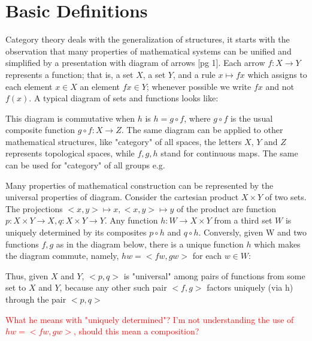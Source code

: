 \section*{Basic Definitions}

Category theory deals with the generalization of structures, it starts with the observation that many properties of mathematical systems can be unified and simplified by a presentation with diagram of arrows [pg 1]. Each arrow $f: X \to Y$ represents a function; that is, a set $X$, a set $Y$, and a rule $x \mapsto fx$ which assigns to each element $x \in X$ an element $fx \in Y$; whenever possible we write $fx$ and not $f(x)$. A typical diagram of sets and functions looks like: 
\begin{center}
\end{center}

This diagram is commutative when $h$ is $h = g \circ f$, where $g \circ f$ is the usual composite function $g \circ f: X \to Z$. The same diagram can be applied to other mathematical structures, like "category" of all spaces, the letters $X$, $Y$ and $Z$ represents topological spaces, while $f, g, h$ stand for continuous maps. The same can be used for "category" of all groups e.g.


Many properties of mathematical construction can be represented by the universal properties of diagram. Consider the cartesian product $X \times Y$ of two sets. The projections $<x,y> \mapsto x, <x, y> \mapsto y$ of the product are function $p: X \times Y \rightarrow X, q: X \times Y \rightarrow Y$. Any function $h: W \to X \times Y$ from a third set $W$ is uniquely determined by its composites $p \circ h$ and $q \circ h$. Conversly, given W and two functions $f, g$ as in the diagram below, there is a unique function $h$ which makes the diagram commute, namely, $hw = <fw, gw>$ for each $w \in W$:

\begin{center}
\end{center}

Thus, given $X$ and $Y$, $<p, q>$ is "universal" among pairs of functions from some set to $X$ and $Y$, because any other such pair $<f, g>$ factors uniquely (via h) through the pair $<p ,q>$

\textcolor{red}{What he means with "uniquely determined"? I'm not understanding the use of $hw = <fw, gw>$, should this mean a composition?}
